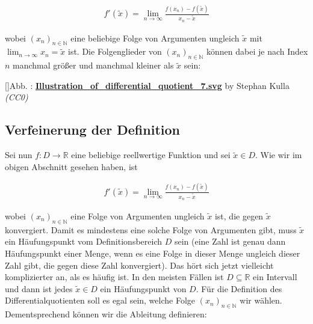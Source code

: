 \documentclass[fontsize=9pt,
               parskip=half-,
               DIV=14,
               listof=chapterentry,
               tocflat]{scrbook}
\newcounter{imagelabel}
\begin{document}
\begin{align*}
f'({\tilde {x}})=\lim _{n\to \infty }{\frac {f(x_{n})-f({\tilde {x}})}{x_{n}-{\tilde {x}}}}
\end{align*}

wobei $(x_{n})_{n\in \mathbb {N} }$ eine beliebige Folge von Argumenten ungleich ${\tilde {x}}$ mit $\lim _{n\to \infty }x_{n}={\tilde {x}}$ ist. Die Folgenglieder von $(x_{n})_{n\in \mathbb {N} }$ können dabei je nach Index $n$ manchmal größer und manchmal kleiner als ${\tilde {x}}$ sein:

[]{Abb. : \protect\href{https://commons.wikimedia.org/wiki/File:Illustration_of_differential_quotient_7.svg}{\textbf{Illustration\allowbreak\_of\allowbreak\_differential\allowbreak\_quotient\allowbreak\_7.svg}} by Stephan Kulla \textit{(CC0)}}\begin{center}
\end{center}

\subsection{Verfeinerung der Definition}

Sei nun $f:D\to \mathbb {R} $ eine beliebige reellwertige Funktion und sei ${\tilde {x}}\in D$. Wie wir im obigen Abschnitt gesehen haben, ist

\begin{align*}
f'({\tilde {x}})=\lim _{n\to \infty }{\frac {f(x_{n})-f({\tilde {x}})}{x_{n}-{\tilde {x}}}}
\end{align*}

wobei $\left(x_{n}\right)_{n\in \mathbb {N} }$ eine Folge von Argumenten ungleich ${\tilde {x}}$ ist, die gegen ${\tilde {x}}$ konvergiert. Damit es mindestens eine solche Folge von Argumenten gibt, muss ${\tilde {x}}$ ein Häufungspunkt vom Definitionsbereich $D$ sein (eine Zahl ist genau dann Häufungspunkt einer Menge, wenn es eine Folge in dieser Menge ungleich dieser Zahl gibt, die gegen diese Zahl konvergiert). Das hört sich jetzt vielleicht komplizierter an, als es häufig ist. In den meisten Fällen ist $D\subseteq \mathbb {R} $ ein Intervall und dann ist jedes ${\tilde {x}}\in D$ ein Häufungspunkt von $D$. Für die Definition des Differentialquotienten soll es egal sein, welche Folge $(x_{n})_{n\in \mathbb {N} }$ wir wählen. Dementsprechend können wir die Ableitung definieren:
\end{document}
